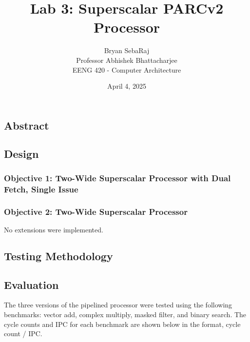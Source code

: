 \documentclass[12pt]{article}
\title{Lab 3: Superscalar PARCv2 Processor}
\author{Bryan SebaRaj \\[0.5em] Professor Abhishek Bhattacharjee \\[0.5em] EENG 420 - Computer Architecture}
\date{April 4, 2025}
\begin{document}
\maketitle


\subsection*{Abstract}

\subsection*{Design}

\subsubsection*{Objective 1: Two-Wide Superscalar Processor with Dual Fetch, Single Issue}

\subsubsection*{Objective 2: Two-Wide Superscalar Processor}

\noindent No extensions were implemented.

\subsection*{Testing Methodology}


\subsection*{Evaluation}

The three versions of the pipelined processor were tested using the following
benchmarks: vector add, complex multiply, masked filter, and binary search. The
cycle counts and IPC for each benchmark are shown below in the format, cycle
count / IPC.
\end{document}
